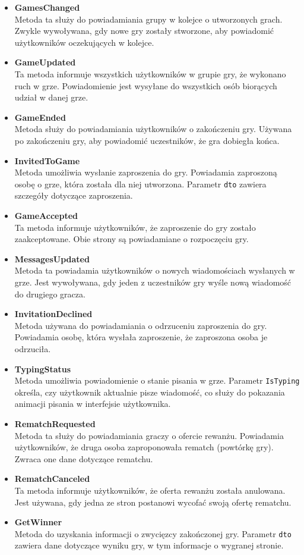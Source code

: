 \documentclass[12pt,a4paper]{article}
\begin{document}
\begin{itemize}
    \item \textbf{GamesChanged} \\
    Metoda ta służy do powiadamiania grupy w kolejce o utworzonych grach. Zwykle wywoływana, gdy nowe gry zostały stworzone, aby powiadomić użytkowników oczekujących w kolejce.
    \item \textbf{GameUpdated} \\
    Ta metoda informuje wszystkich użytkowników w grupie gry, że wykonano ruch w grze. Powiadomienie jest wysyłane do wszystkich osób biorących udział w danej grze.
    \item \textbf{GameEnded} \\
    Metoda służy do powiadamiania użytkowników o zakończeniu gry. Używana po zakończeniu gry, aby powiadomić uczestników, że gra dobiegła końca.
    \item \textbf{InvitedToGame} \\
    Metoda umożliwia wysłanie zaproszenia do gry. Powiadamia zaproszoną osobę o grze, która została dla niej utworzona. Parametr \texttt{dto} zawiera szczegóły dotyczące zaproszenia.
    \item \textbf{GameAccepted} \\
    Ta metoda informuje użytkowników, że zaproszenie do gry zostało zaakceptowane. Obie strony są powiadamiane o rozpoczęciu gry.
    \item \textbf{MessagesUpdated} \\
    Metoda ta powiadamia użytkowników o nowych wiadomościach wysłanych w grze. Jest wywoływana, gdy jeden z uczestników gry wyśle nową wiadomość do drugiego gracza.
    \item \textbf{InvitationDeclined} \\
    Metoda używana do powiadamiania o odrzuceniu zaproszenia do gry. Powiadamia osobę, która wysłała zaproszenie, że zaproszona osoba je odrzuciła.
    \item \textbf{TypingStatus} \\
    Metoda umożliwia powiadomienie o stanie pisania w grze. Parametr \texttt{IsTyping} określa, czy użytkownik aktualnie pisze wiadomość, co służy do pokazania animacji pisania w interfejsie użytkownika.
    \item \textbf{RematchRequested} \\
    Metoda ta służy do powiadamiania graczy o ofercie rewanżu. Powiadamia użytkowników, że druga osoba zaproponowała rematch (powtórkę gry). Zwraca one dane dotyczące rematchu.
    \item \textbf{RematchCanceled} \\
    Ta metoda informuje użytkowników, że oferta rewanżu została anulowana. Jest używana, gdy jedna ze stron postanowi wycofać swoją ofertę rematchu.
    \item \textbf{GetWinner} \\
    Metoda do uzyskania informacji o zwycięzcy zakończonej gry. Parametr \texttt{dto} zawiera dane dotyczące wyniku gry, w tym informacje o wygranej stronie.
\end{itemize}
\end{document}
